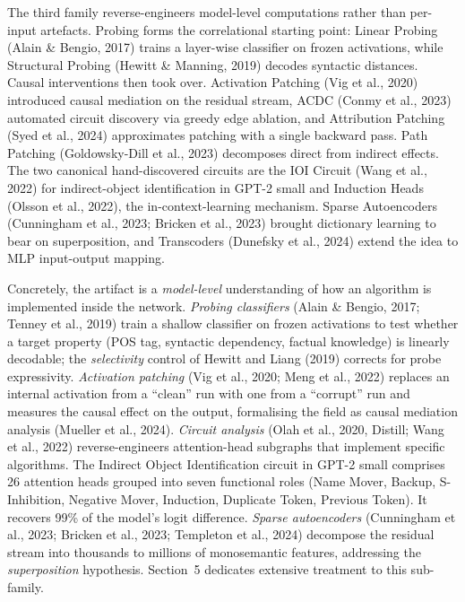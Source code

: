 The third family reverse-engineers model-level computations rather than per-input artefacts. Probing forms the correlational starting point: Linear Probing (Alain \& Bengio, 2017) trains a layer-wise classifier on frozen activations, while Structural Probing (Hewitt \& Manning, 2019) decodes syntactic distances. Causal interventions then took over. Activation Patching (Vig et al., 2020) introduced causal mediation on the residual stream, ACDC (Conmy et al., 2023) automated circuit discovery via greedy edge ablation, and Attribution Patching (Syed et al., 2024) approximates patching with a single backward pass. Path Patching (Goldowsky-Dill et al., 2023) decomposes direct from indirect effects. The two canonical hand-discovered circuits are the IOI Circuit (Wang et al., 2022) for indirect-object identification in GPT-2 small and Induction Heads (Olsson et al., 2022), the in-context-learning mechanism. Sparse Autoencoders (Cunningham et al., 2023; Bricken et al., 2023) brought dictionary learning to bear on superposition, and Transcoders (Dunefsky et al., 2024) extend the idea to MLP input-output mapping.

Concretely, the artifact is a \emph{model-level} understanding of how an algorithm is implemented inside the network. \emph{Probing classifiers} (Alain \& Bengio, 2017; Tenney et al., 2019) train a shallow classifier on frozen activations to test whether a target property (POS tag, syntactic dependency, factual knowledge) is linearly decodable; the \emph{selectivity} control of Hewitt and Liang (2019) corrects for probe expressivity. \emph{Activation patching} (Vig et al., 2020; Meng et al., 2022) replaces an internal activation from a ``clean'' run with one from a ``corrupt'' run and measures the causal effect on the output, formalising the field as causal mediation analysis (Mueller et al., 2024). \emph{Circuit analysis} (Olah et al., 2020, Distill; Wang et al., 2022) reverse-engineers attention-head subgraphs that implement specific algorithms. The Indirect Object Identification circuit in GPT-2 small comprises 26 attention heads grouped into seven functional roles (Name Mover, Backup, S-Inhibition, Negative Mover, Induction, Duplicate Token, Previous Token). It recovers 99\% of the model's logit difference. \emph{Sparse autoencoders} (Cunningham et al., 2023; Bricken et al., 2023; Templeton et al., 2024) decompose the residual stream into thousands to millions of monosemantic features, addressing the \emph{superposition} hypothesis. Section~5 dedicates extensive treatment to this sub-family.

